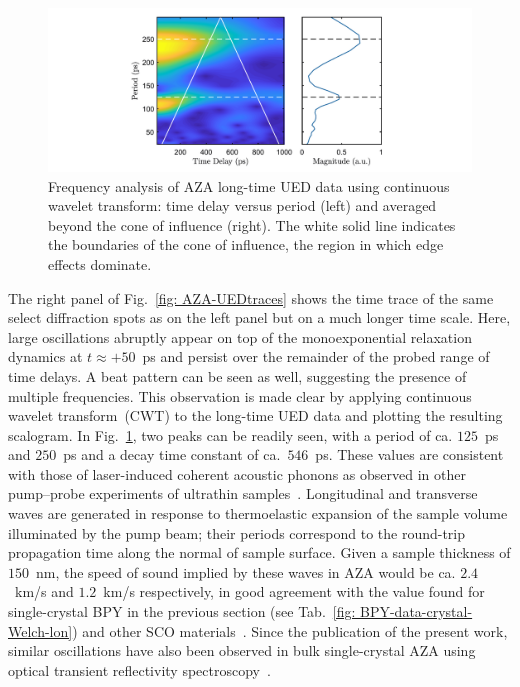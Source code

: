 \begin{figure}[ht!]
  \centering
  \includegraphics[width = \textwidth]{Figures/fig_AZA_frequency.pdf}
  \caption[Frequency analysis of AZA long-time UED data.]{
    Frequency analysis of AZA long-time UED data
    using continuous wavelet transform:
    time delay versus period (left) and
    averaged beyond the cone of influence (right).
    The white solid line indicates the boundaries of the cone of influence,
    the region in which edge effects dominate.
  }
  \label{fig: AZA-frequency}
\end{figure}

The right panel of Fig.~\ref{fig: AZA-UEDtraces} shows the time trace of
the same select diffraction spots as on the left panel
but on a much longer time scale.
Here, large oscillations abruptly appear on top of the monoexponential relaxation dynamics
at $t \approx +50$~ps and persist over the remainder of the probed range of time delays.
A beat pattern can be seen as well, suggesting the presence of multiple frequencies.
%
This observation is made clear by applying continuous wavelet transform~(CWT)
to the long-time UED data and plotting the resulting scalogram.
In Fig.~\ref{fig: AZA-frequency}, two peaks can be readily seen,
with a period of ca. $125$~ps and $250$~ps and a decay time constant of ca.~$546$~ps.
These values are consistent with those of laser-induced coherent acoustic phonons
as observed in other pump--probe experiments of ultrathin samples~\cite{Harb2009, Gao2013, Field2016}.
%
Longitudinal and transverse waves are generated in response to thermoelastic expansion of
the sample volume illuminated by the pump beam;
their periods correspond to the round-trip propagation time along the normal of sample surface.
%
Given a sample thickness of $150$~nm, the speed of sound implied by these waves in AZA
would be ca. $2.4$~km/s and $1.2$~km/s respectively, in good agreement with the value
found for single-crystal BPY in the previous section (see Tab.~\ref{fig: BPY-data-crystal-Welch-lon})
and other SCO materials~\cite{Shepherd2012, Hernandez2014, Felix2015}.
%
Since the publication of the present work,
similar oscillations have also been observed in bulk single-crystal AZA using
optical transient reflectivity spectroscopy~\cite{Parpiiev2017}.



